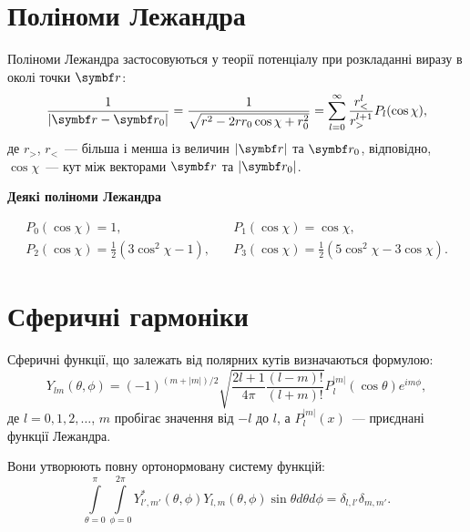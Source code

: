 \section{Поліноми Лежандра}\label{Polinoms}

Поліноми Лежандра застосовуються у теорії потенціалу при розкладанні виразу в околі точки $\vect{r}$:
\begin{equation*}\label{}
    \frac{1}{|\vect{r} - \vect{r}_0|} = \frac{1}{\sqrt{r^2 - 2rr_0 \cos\chi + r_0^2 }}  =  \sum\limits_{l = 0}^{\infty} \frac{r^l_<}{r^{l+1}_>} P_l(\cos\chi),
\end{equation*}
де $r_>$, $r_<$~--- більша і менша із величин $|\vect{r}|$ та $\vect{r}_0$, відповідно, $\cos\chi$~--- кут між векторами $\vect{r}$ та $|\vect{r}_0|$.

\medskip%
\textbf{Деякі поліноми Лежандра}

\begin{align*}
P_{0}(\cos\chi)  = 1, &\quad P_{1}(\cos\chi)  = \cos\chi, \\
P_{2}(\cos\chi)  = \frac {1}{2}(3\cos^2\chi-1), &\quad P_{3}(\cos\chi)  = \frac {1}{2}(5\cos^2\chi-3\cos\chi).
\end{align*}

\section{Сферичні гармоніки}\label{Spherical_Harmonics}

Сферичні функції, що залежать від полярних кутів визначаються формулою:
\begin{equation*}
    Y_{lm}(\theta,\phi) = (-1)^{(m+|m|)/2} \sqrt{\frac{2l+1}{4\pi}\frac{(l-m)!}{(l+m)!}}P_l^{|m|}(\cos \theta) e^{im\phi},
\end{equation*}
де $l = 0,1,2, \ldots$, $m$ пробігає значення від $-l$ до $l$, а $P_l^{|m|}(x)$~--- приєднані функції Лежандра.

Вони утворюють повну ортонормовану систему функцій:
\[
    \int\limits_{\theta=0}^{\pi} \int\limits_{\phi=0}^{2\pi} Y^*_{l',m'}(\theta, \phi) Y_{l,m}(\theta, \phi) \sin\theta d\theta d\phi  = \delta_{l,l'} \delta_{m,m'}.
\]

